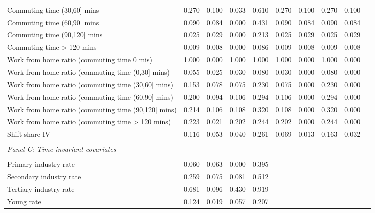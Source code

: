 \begin{tabular}{l*{9}{c}}
Commuting time (30,60] mins&       0.270&       0.100&       0.033&       0.610&       0.270&       0.100&       0.270&       0.100\\
Commuting time (60,90] mins&       0.090&       0.084&       0.000&       0.431&       0.090&       0.084&       0.090&       0.084\\
Commuting time (90,120] mins&       0.025&       0.029&       0.000&       0.213&       0.025&       0.029&       0.025&       0.029\\
Commuting time > 120 mins&       0.009&       0.008&       0.000&       0.086&       0.009&       0.008&       0.009&       0.008\\
Work from home ratio (commuting time 0 mis)&       1.000&       0.000&       1.000&       1.000&       1.000&       0.000&       1.000&       0.000\\
Work from home ratio (commuting time (0,30] mins)&       0.055&       0.025&       0.030&       0.080&       0.030&       0.000&       0.080&       0.000\\
Work from home ratio (commuting time (30,60] mins)&       0.153&       0.078&       0.075&       0.230&       0.075&       0.000&       0.230&       0.000\\
Work from home ratio (commuting time (60,90] mins)&       0.200&       0.094&       0.106&       0.294&       0.106&       0.000&       0.294&       0.000\\
Work from home ratio (commuting time (90,120] mins)&       0.214&       0.106&       0.108&       0.320&       0.108&       0.000&       0.320&       0.000\\
Work from home ratio (commuting time > 120 mins)&       0.223&       0.021&       0.202&       0.244&       0.202&       0.000&       0.244&       0.000\\
Shift-share IV      &       0.116&       0.053&       0.040&       0.261&       0.069&       0.013&       0.163&       0.032\\
\\ \multicolumn{1}{l}{\textit{Panel C: Time-invariant covariates}} \\\\[-1ex]
Primary industry rate&       0.060&       0.063&       0.000&       0.395\\
Secondary industry rate&       0.259&       0.075&       0.081&       0.512\\
Tertiary industry rate&       0.681&       0.096&       0.430&       0.919\\
Young rate          &       0.124&       0.019&       0.057&       0.207\\

\end{tabular}
